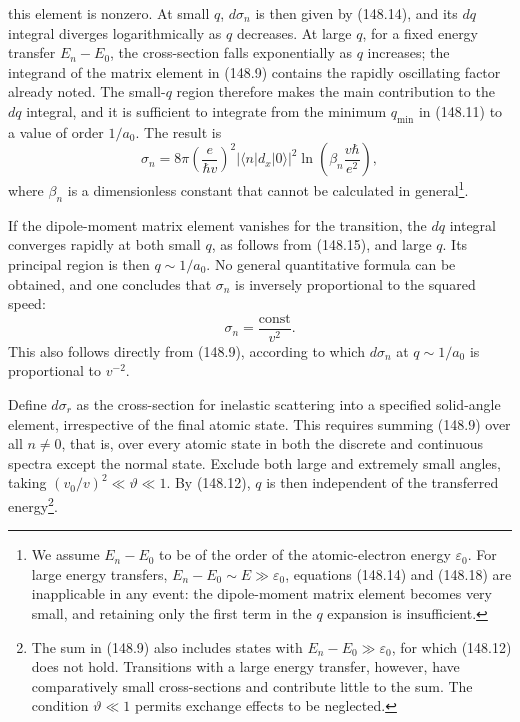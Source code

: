 this element is nonzero. At small $q$, $d\sigma_n$ is then given by (148.14), and its $dq$ integral diverges logarithmically as $q$ decreases. At large $q$, for a fixed energy transfer $E_n-E_0$, the cross-section falls exponentially as $q$ increases; the integrand of the matrix element in (148.9) contains the rapidly oscillating factor already noted. The small-$q$ region therefore makes the main contribution to the $dq$ integral, and it is sufficient to integrate from the minimum $q_{\min}$ in (148.11) to a value of order $1/a_0$. The result is
\begin{equation}
 \sigma_n=8\pi\left(\frac{e}{\hbar v}\right)^2|\langle n|d_x|0\rangle|^2
 \ln\left(\beta_n\frac{v\hbar}{e^2}\right),
 \tag{148.18}
\end{equation}
where $\beta_n$ is a dimensionless constant that cannot be calculated in general\footnote{We assume $E_n-E_0$ to be of the order of the atomic-electron energy $\varepsilon_0$. For large energy transfers, $E_n-E_0\sim E\gg\varepsilon_0$, equations (148.14) and (148.18) are inapplicable in any event: the dipole-moment matrix element becomes very small, and retaining only the first term in the $q$ expansion is insufficient.}.

If the dipole-moment matrix element vanishes for the transition, the $dq$ integral converges rapidly at both small $q$, as follows from (148.15), and large $q$. Its principal region is then $q\sim1/a_0$. No general quantitative formula can be obtained, and one concludes that $\sigma_n$ is inversely proportional to the squared speed:
\begin{equation}
 \sigma_n=\frac{\mathrm{const}}{v^2}.
 \tag{148.19}
\end{equation}
This also follows directly from (148.9), according to which $d\sigma_n$ at $q\sim1/a_0$ is proportional to $v^{-2}$.

Define $d\sigma_r$ as the cross-section for inelastic scattering into a specified solid-angle element, irrespective of the final atomic state. This requires summing (148.9) over all $n\ne0$, that is, over every atomic state in both the discrete and continuous spectra except the normal state. Exclude both large and extremely small angles, taking $(v_0/v)^2\ll\vartheta\ll1$. By (148.12), $q$ is then independent of the transferred energy\footnote{The sum in (148.9) also includes states with $E_n-E_0\gg\varepsilon_0$, for which (148.12) does not hold. Transitions with a large energy transfer, however, have comparatively small cross-sections and contribute little to the sum. The condition $\vartheta\ll1$ permits exchange effects to be neglected.}.

